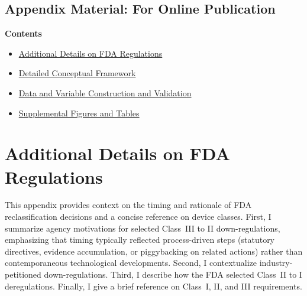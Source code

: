 \documentclass[letterpaper,12pt]{article}
\theoremstyle{definition}
\begin{document}
\clearpage
\newpage




\begin{center}
\section*{Appendix Material: For Online Publication}
\end{center}

\appendix

\renewcommand{\figurename}{\bf Appendix Figure}
\renewcommand{\tablename}{\bf Appendix Table}

\vspace{1em}
\noindent\textbf{Contents}
\begin{itemize}[leftmargin=*,itemsep=2pt]
  \item[{\ref*{sec:AppendixRegulations}.}] \hyperref[sec:AppendixRegulations]{Additional Details on FDA Regulations}
  \item[{\ref*{sec:AppendixConcept}.}] \hyperref[sec:AppendixConcept]{Detailed Conceptual Framework}
  \item[{\ref*{app:data}.}] \hyperref[app:data]{Data and Variable Construction and Validation}
  \item[{\ref*{sec:SuppFigTab}.}] \hyperref[sec:SuppFigTab]{Supplemental Figures and Tables}
\end{itemize}

\newpage

\section{Additional Details on FDA Regulations}\label{sec:AppendixRegulations}


This appendix provides context on the timing and rationale of FDA reclassification decisions and a concise reference on device classes. First, I summarize agency motivations for selected Class~III to II down-regulations, emphasizing that timing typically reflected process-driven steps (statutory directives, evidence accumulation, or piggybacking on related actions) rather than contemporaneous technological developments. Second, I contextualize industry-petitioned down-regulations. Third, I describe how the FDA selected Class~II to I deregulations. Finally, I give a brief reference on Class~I, II, and III requirements.
\end{document}
